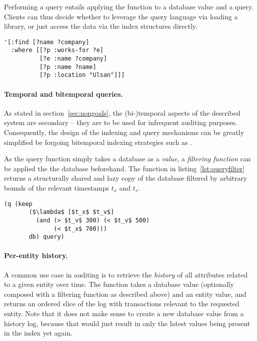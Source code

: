 Performing a query entails applying the  function to a database value and a query. Clients can thus decide whether to leverage the query language via loading a library, or just access the data via the index structures directly.

\begin{lstlisting}[label={lst:example_query},caption="Who from Ulsan is working for whom?"]
'[:find [?name ?company]
  :where [[?p :works-for ?e]
          [?e :name ?company]
          [?p :name ?name]
          [?p :location "Ulsan"]]]
\end{lstlisting}

\paragraph{Temporal and bitemporal queries.}
As stated in section~\ref{sec:nongoals}, the (bi-)temporal aspects of the described system are secondary -- they are to be used for infrequent auditing purposes. Consequently, the design of the indexing and query mechanisms can be greatly simplified be forgoing bitemporal indexing strategies such as \cite{nascimento1995ivtt}.

As the query function simply takes a database as a \emph{value}, a \emph{filtering function} can be applied the the database beforehand. The  function in listing~\ref{lst:queryfilter} returns a structurally shared and lazy copy of the database filtered by arbitrary bounds of the relevant timestamps $t_x$ and $t_v$.

\begin{lstlisting}[label={lst:queryfilter},caption=Applying a temporal filter before querying,morekeywords={keep,q,<,>}]
  (q (keep
       ($\lambda$ [$t_x$ $t_v$]
         (and (> $t_v$ 300) (< $t_v$ 500)
              (< $t_x$ 700)))
       db) query)
  \end{lstlisting}


\paragraph{Per-entity history.} A common use case in auditing is to retrieve the \emph{history} of all attributes related to a given entity over time. The  function takes a database value (optionally composed with a filtering function as described above) and an entity value, and returns an ordered slice of the log with transactions relevant to the requested entity. Note that it does not make sense to create a new database value from a history log, because that would just result in only the latest values being present in the index yet again.


